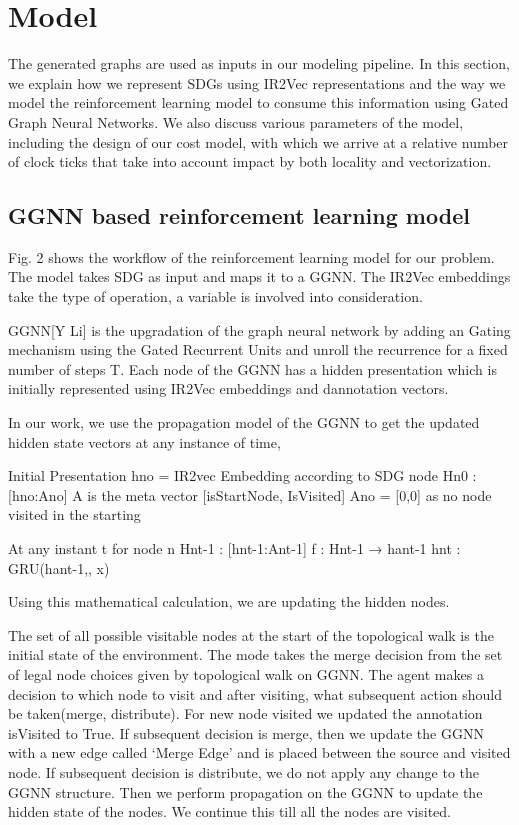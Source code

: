 \section{Model}
 The generated graphs are used as inputs in our modeling pipeline. In this section, we explain how we represent SDGs using IR2Vec representations and the way we model the reinforcement learning model to consume this information using Gated Graph Neural Networks. We also discuss various parameters of the model, including the design of our cost model, with which we arrive at a relative number of clock ticks that take into account impact by both locality and vectorization.


\subsection{GGNN based reinforcement learning model}
    Fig. 2 shows the workflow of the reinforcement learning model for our problem. The model takes SDG as input and maps it to a GGNN. The IR2Vec embeddings take the type of operation, a variable is involved into consideration.

    GGNN[Y Li] is the upgradation of the graph neural network by adding an Gating mechanism using the Gated Recurrent Units  and unroll the recurrence
for a fixed number of steps T. Each node of the GGNN has a hidden presentation which is initially represented using IR2Vec embeddings and dannotation vectors. 

In our work, we use the propagation model of the GGNN to get the updated hidden state vectors at any instance of time, 

Initial Presentation 
hno = IR2vec Embedding according to SDG node   
Hn0 : [hno:Ano]  
A is the meta vector [isStartNode, IsVisited]
Ano  = [0,0]  as no node visited in the starting

At any instant t for node n
Hnt-1 : [hnt-1:Ant-1]
f : Hnt-1 → hant-1 
hnt	 : GRU(hant-1,, x)

Using this mathematical calculation, we are updating the hidden nodes.
 
    The set of all possible visitable nodes at the start of the topological walk is the initial state of the environment. The mode takes the merge decision from the set of legal node choices given by topological walk on GGNN. The agent makes a decision to which node to visit and after visiting, what subsequent action should be taken(merge, distribute). For new node visited we updated the annotation isVisited to True. If subsequent decision is merge, then we update the GGNN with a new edge called ‘Merge Edge’ and is placed  between the source and visited node. If subsequent decision is distribute, we do not apply any change to the GGNN structure. Then we perform propagation on the GGNN to update the hidden state of the nodes. We continue this till all the nodes are visited.

